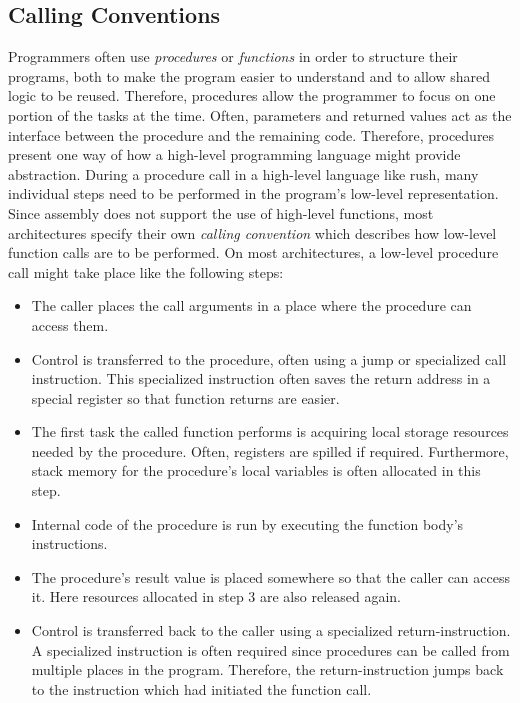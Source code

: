 \subsection{Calling Conventions}

Programmers often use \emph{procedures} or \emph{functions} in order to structure their programs,
both to make the program easier to understand and to allow shared logic to be reused.
Therefore, procedures allow the programmer to focus on one portion of the tasks at the time.
Often, parameters and returned values act as the interface between the procedure and the remaining code.
Therefore, procedures present one way of how a high-level programming language might provide abstraction.
During a procedure call in a high-level language like rush, many individual steps need to be performed in the program's low-level representation.
Since assembly does not support the use of high-level functions, most architectures specify their own \emph{calling convention} which describes how low-level function calls are to be performed.
On most architectures, a low-level procedure call might take place like the following steps:

\begin{itemize}
	\item The caller places the call arguments in a place where the procedure can access them.
	\item Control is transferred to the procedure, often using a jump or specialized call instruction.
	      This specialized instruction often saves the return address in a special register so that function returns are easier.
	\item The first task the called function performs is acquiring local storage resources needed by the procedure.
	      Often, registers are spilled if required.
	      Furthermore, stack memory for the procedure's local variables is often allocated in this step.
	\item Internal code of the procedure is run by executing the function body's instructions.
	\item The procedure's result value is placed somewhere so that the caller can access it.
	      Here resources allocated in step 3 are also released again.
	\item Control is transferred back to the caller using a specialized return-instruction.
	      A specialized instruction is often required since procedures can be called from multiple places in the program.
	      Therefore, the return-instruction jumps back to the instruction which had initiated the function call.
\end{itemize}

